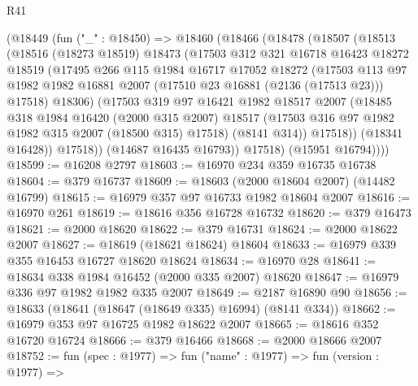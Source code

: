\begin{lexlean}{R41}
\begin{coremodule}
      (@18449
        (fun ("_" : @18450) =>
        @18460
          (@18466
            (@18478
              (@18507
                (@18513
                  (@18516
                    (@18273 @18519)
                    @18473
                    (@17503
                      @312
                      @321
                      @16718
                      @16423
                      @18272
                      @18519
                      (@17495
                        @266
                        @115
                        @1984
                        @16717
                        @17052
                        @18272
                        (@17503
                          @113
                          @97
                          @1982
                          @1982
                          @16881
                          @2007
                          (@17510 @23 @16881 (@2136 (@17513 @23)))
                          @17518)
                        @18306)
                      (@17503
                        @319
                        @97
                        @16421
                        @1982
                        @18517
                        @2007
                        (@18485
                          @318
                          @1984
                          @16420
                          (@2000 @315 @2007)
                          @18517
                          (@17503 @316 @97 @1982 @1982 @315 @2007 (@18500 @315) @17518)
                          (@8141 @314))
                        @17518))
                    (@18341 @16428))
                  @17518))
              (@14687 @16435 @16793))
            @17518)
          (@15951 @16794))))
@18599 := @16208 @2797
@18603 := @16970 @234 @359 @16735 @16738
@18604 := @379 @16737
@18609 := @18603 (@2000 @18604 @2007) (@14482 @16799)
@18615 := @16979 @357 @97 @16733 @1982 @18604 @2007
@18616 := @16970 @261
@18619 := @18616 @356 @16728 @16732
@18620 := @379 @16473
@18621 := @2000 @18620
@18622 := @379 @16731
@18624 := @2000 @18622 @2007
@18627 := @18619 (@18621 @18624) @18604
@18633 := @16979 @339 @355 @16453 @16727 @18620 @18624
@18634 := @16970 @28
@18641 := @18634 @338 @1984 @16452 (@2000 @335 @2007) @18620
@18647 := @16979 @336 @97 @1982 @1982 @335 @2007
@18649 := @2187 @16890 @90
@18656 := @18633 (@18641 (@18647 (@18649 @335) @16994) (@8141 @334))
@18662 := @16979 @353 @97 @16725 @1982 @18622 @2007
@18665 := @18616 @352 @16720 @16724
@18666 := @379 @16466
@18668 := @2000 @18666 @2007
@18752 := fun (spec : @1977) =>
  fun ("name" : @1977) =>
  fun (version : @1977) =>

\end{coremodule}
\end{lexlean}
